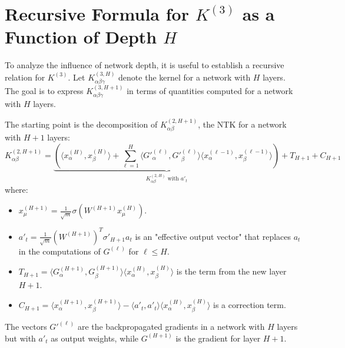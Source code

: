 \documentclass[11pt,a4paper]{article}
\theoremstyle{definition}
\begin{document}
\newpage


\section{Recursive Formula for $K^{(3)}$ as a Function of Depth $H$}

To analyze the influence of network depth, it is useful to establish a recursive relation for $K^{(3)}$. Let $K^{(3, H)}_{\alpha\beta\gamma}$ denote the kernel for a network with $H$ layers. The goal is to express $K^{(3, H+1)}_{\alpha\beta\gamma}$ in terms of quantities computed for a network with $H$ layers.

The starting point is the decomposition of $K^{(2, H+1)}_{\alpha\beta}$, the NTK for a network with $H+1$ layers:
\begin{equation}
K^{(2, H+1)}_{\alpha\beta} = \underbrace{\left( \langle x^{(H)}_\alpha, x^{(H)}_\beta \rangle + \sum_{\ell=1}^{H} \langle G'^{(\ell)}_\alpha, G'^{(\ell)}_\beta \rangle \langle x^{(\ell-1)}_\alpha, x^{(\ell-1)}_\beta \rangle \right)}_{K^{(2,H)}_{\alpha\beta} \text{ with } a'_t} + T_{H+1} + C_{H+1}
\end{equation}
where:
\begin{itemize}
    \item $x^{(H+1)}_\mu = \frac{1}{\sqrt{m}}\sigma(W^{(H+1)} x^{(H)}_\mu)$.
    \item $a'_t = \frac{1}{\sqrt{m}} (W^{(H+1)})^T \sigma'_{H+1} a_t$ is an "effective output vector" that replaces $a_t$ in the computations of $G^{(\ell)}$ for $\ell \le H$.
    \item $T_{H+1} = \langle G^{(H+1)}_\alpha, G^{(H+1)}_\beta \rangle \langle x^{(H)}_\alpha, x^{(H)}_\beta \rangle$ is the term from the new layer $H+1$.
    \item $C_{H+1} = \langle x^{(H+1)}_\alpha, x^{(H+1)}_\beta \rangle - \langle a'_t, a'_t \rangle \langle x^{(H)}_\alpha, x^{(H)}_\beta \rangle$ is a correction term.
\end{itemize}
The vectors $G'^{(\ell)}$ are the backpropagated gradients in a network with $H$ layers but with $a'_t$ as output weights, while $G^{(H+1)}$ is the gradient for layer $H+1$.
\end{document}

